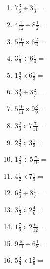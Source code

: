 \documentclass[12pt]{article}
\begin{document}
\begin{enumerate}
\item \large $ 7 \frac{3}{6} \div 3 \frac{1}{3} = $ \vspace{1.6cm}
\item \large $ 4 \frac{1}{12} \div 8 \frac{1}{2} = $ \vspace{1.6cm}
\item \large $ 5 \frac{10}{11} \times 6 \frac{2}{6} = $ \vspace{1.6cm}
\item \large $ 3 \frac{1}{6} \div 6 \frac{1}{4} = $ \vspace{1.6cm}
\item \large $ 1 \frac{6}{8} \times 6 \frac{1}{3} = $ \vspace{1.6cm}
\item \large $ 3 \frac{3}{9} \div 3 \frac{2}{7} = $ \vspace{1.6cm}
\newpage
\item \large $ 5 \frac{10}{11} \times 9 \frac{8}{9} = $ \vspace{1.6cm}
\item \large $ 3 \frac{2}{3} \times 7 \frac{7}{11} = $ \vspace{1.6cm}
\item \large $ 2 \frac{3}{8} \times 3 \frac{1}{3} = $ \vspace{1.6cm}
\item \large $ 1 \frac{2}{4} \div 5 \frac{7}{10} = $ \vspace{1.6cm}
\item \large $ 4 \frac{1}{2} \times 7 \frac{1}{3} = $ \vspace{1.6cm}
\item \large $ 6 \frac{2}{3} \div 8 \frac{1}{7} = $ \vspace{1.6cm}
\item \large $ 3 \frac{1}{2} \times 2 \frac{4}{6} = $ \vspace{1.6cm}
\item \large $ 1 \frac{7}{9} \times 2 \frac{6}{12} = $ \vspace{1.6cm}
\item \large $ 9 \frac{5}{11} \div 6 \frac{1}{8} = $ \vspace{1.6cm}
\item \large $ 5 \frac{3}{9} \times 1 \frac{3}{9} = $ \vspace{1.6cm}
\end{enumerate}
\newpage
\end{document}
